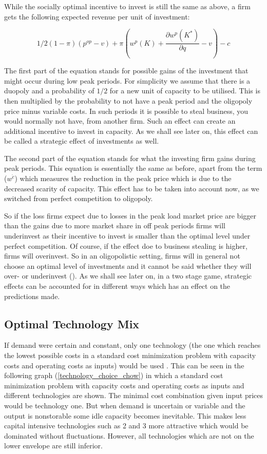 While the socially optimal incentive to invest is still the same as above, a firm gets the following expected revenue per unit of investment:

\begin{equation}
	1/2 (1-\pi) (p^{op}-v) + \pi (w^p(K)+\frac{\partial w^p(K^*)}{\partial q}-v) - c
\end{equation}

The first part of the equation stands for possible gains of the investment that might occur during low peak periods. For simplicity we assume that there is a duopoly and a probability of $1/2$ for a new unit of capacity to be utilised. This is then multiplied by the probability to not have a peak period and the oligopoly price minus variable costs. In such periods it is possible to steal business, you would normally not have, from another firm. Such an effect can create an additional incentive to invest in capacity. As we shall see later on, this effect can be called a strategic effect of investments as well.

The second part of the equation stands for what the investing firm gains during peak periods. This equation is essentially the same as before, apart from the term ($w^{\acute{c}}$) which measures the reduction in the peak price which is due to the decreased scarity of capacity. This effect has to be taken into account now, as we switched from perfect competition to oligopoly.

So if the loss firms expect due to losses in the peak load market price are bigger than the gains due to more market share in off peak periods firms will underinvest as their incentive to invest is smaller than the optimal level under perfect competition. Of course, if the effect doe to business stealing is higher, firms will overinvest. So in an oligopolistic setting, firms will in general not choose an optimal level of investments and it cannot be said whether they will over- or underinvest (\cite{Fehr1994}). As we shall see later on, in a two stage game, strategic effects can be accounted for in different ways which has an effect on the predictions made.

\subsection{Optimal Technology Mix}

If demand were certain and constant, only one technology (the one which reaches the lowest possible costs in a standard cost minimization problem with capacity costs and operating costs as inputs) would be used \citep[see][pg. 183]{Chao1983}. This can be seen in the following graph (\ref{technology_choice_chow}) in which a standard cost minimization problem with capacity costs and operating costs as inputs and different technologies are shown. The minimal cost combination given input prices would be technology one. But when demand is uncertain or variable and the output is nonstorable some idle capacity becomes inevitable. This makes less capital intensive technologies such as 2 and 3 more attractive which would be dominated without fluctuations. However, all technologies which are not on the lower envelope are still inferior.

